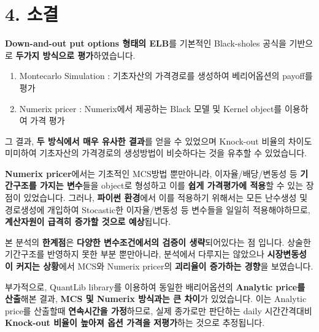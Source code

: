 \documentclass[
  a4paper,
  DIV=11,
  numbers=noendperiod]{scrreprt}
\providecommand{\tightlist}{%
  \setlength{\itemsep}{0pt}\setlength{\parskip}{0pt}}\usepackage{longtable,booktabs,array}
\begin{document}
\section*{4. 소결}\label{uxc18cuxacb0}


\textbf{Down-and-out put options 형태의 ELB}를 기본적인 Black-sholes
공식을 기반으로 \textbf{두가지 방식으로 평가}하였습니다.

\begin{enumerate}
\def\labelenumi{\arabic{enumi}.}
\tightlist
\item
  Montecarlo Simulation : 기초자산의 가격경로를 생성하여 베리어옵션의
  payoff를 평가
\item
  Numerix pricer : Numerix에서 제공하는 Black 모델 및 Kernel object를
  이용하여 가격 평가
\end{enumerate}

그 결과, \textbf{두 방식에서 매우 유사한 결과}를 얻을 수 있었으며
Knock-out 비율의 차이도 미미하여 기초자산의 가격경로의 생성방법이
비슷하다는 것을 유추할 수 있었습니다.

\textbf{Numerix pricer}에서는 기초적인 MCS방법 뿐만아니라,
이자율/배당/변동성 등 \textbf{기간구조를 가지는 변수}들을 object로
형성하고 이를 \textbf{쉽게 가격평가에 적용}할 수 있는 장점이 있었습니다.
그러나, \textbf{파이썬 환경}에서 이를 적용하기 위해서는 모든 난수생성 및
경로생성에 개입하여 Stocastic한 이자율/변동성 등 변수들을 일일히
적용해야하므로, \textbf{계산자원이 급격히 증가할 것으로 예상}됩니다.

본 분석의 \textbf{한계점}은 \textbf{다양한 변수조건에서의 검증이
생략}되어있다는 점 입니다. 상술한 기간구조를 반영하지 못한 부분
뿐만아니라, 분석에서 다루지는 않았으나 \textbf{시장변동성이 커지는
상황}에서 MCS와 Numerix pricer의 \textbf{괴리율이 증가하는 경향}을
보였습니다.

부가적으로, QuantLib library를 이용하여 동일한 배리어옵션의
\textbf{Analytic price를 산출}해본 결과, \textbf{MCS 및 Numerix 방식과는
큰 차이}가 있었습니다. 이는 Analytic price를 산출할때 \textbf{연속시간을
가정}하므로, 실제 종가로만 판단하는 daily 시간간격대비 \textbf{Knock-out
비율이 높아져 옵션 가격을 저평가}하는 것으로 추정됩니다.
\end{document}
